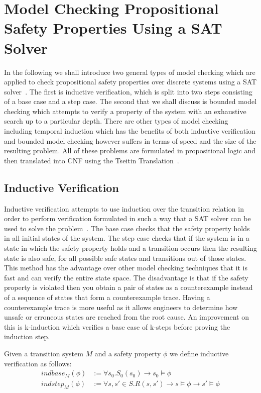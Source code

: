 \section{Model Checking Propositional Safety Properties Using a SAT Solver}


In the following we shall introduce two general types of model checking  which are applied to check propositional safety properties over discrete systems using a SAT solver~\cite{MS00,EC01}. The first is inductive verification, which is split into two steps consisting of a base case and a step case.  The second that we shall discuss is bounded model checking which attempts to verify a property of the system with an exhaustive search up to a particular depth. There are other types of model checking including temporal induction which has the benefits of both inductive verification and bounded model checking however suffers in terms of speed and the size of the resulting problem. All of these problems are formulated in propositional logic and then translated into CNF using the Tseitin Translation~\cite{GT83}.



\subsection*{Inductive Verification}

Inductive verification attempts to use induction over the transition relation in order to perform verification formulated in such a way that a SAT solver can be used to solve the problem~\cite{MS00}. The base case checks that the safety property holds in all initial states of the system. The step case checks that if the system is in a state in which the safety property holds and a transition occurs then the resulting state is also safe, for all possible safe states and transitions out of those states. This method has the advantage over other model checking techniques that it is fast and can verify the entire state space. The disadvantage is that if the safety property is violated then you obtain a pair of states as a counterexample instead of a sequence of states that form a counterexample trace. Having a counterexample trace is more useful as it allows engineers to determine how unsafe or erroneous states are reached from the root cause. An improvement on this is k-induction \cite{EN03} which verifies a base case of k-steps before proving the induction step.
\medskip
\begin{mydef}
Given a transition system $M$ and a safety property $\phi$ we define inductive verification as follows:
\begin{align*}
indbase_M(\phi)  &:= \forall s_0. S_0(s_0)  \to s_0 \models \phi \\
indstep_M(\phi) &:= \forall s,s' \in S. R(s, s') \to s \models \phi  \to s' \models \phi
\end{align*}
\end{mydef}
\medskip
